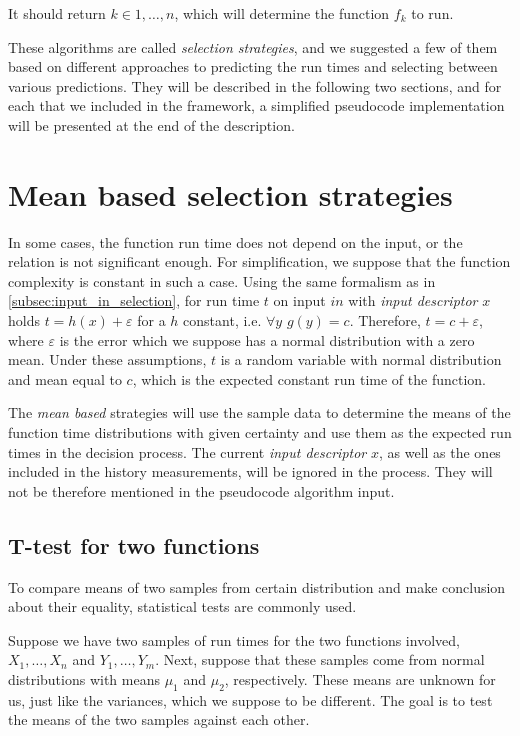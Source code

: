 It should return $k \in {1,\dots,n}$, which will determine the function $f_k$ to run.

These algorithms are called \textit{selection strategies}, and we suggested a few of them based on different approaches to predicting the run times and selecting between various predictions. They will be described in the following two sections, and for each that we included in the framework, a simplified pseudocode implementation will be presented at the end of the description.

\section{Mean based selection strategies}
\label{sec:mean_based_strategies}

In some cases, the function run time does not depend on the input, or the relation is not significant enough. For simplification, we suppose that the function complexity is constant in such a case. Using the same formalism as in \ref{subsec:input_in_selection}, for run time $t$ on input $in$ with \textit{input descriptor} $x$ holds \(t = h(x) + \varepsilon\) for a $h$ constant, i.e. $\forall y$ $g(y) = c$. Therefore, $t = c + \varepsilon$, where $\varepsilon$ is the error which we suppose has a normal distribution with a zero mean. Under these assumptions, $t$ is a random variable with normal distribution and mean equal to $c$, which is the expected constant run time of the function.

The \textit{mean based} strategies will use the sample data to determine the means of the function time distributions with given certainty and use them as the expected run times in the decision process. The current \textit{input descriptor} $x$, as well as the ones included in the history measurements, will be ignored in the process. They will not be therefore mentioned in the pseudocode algorithm input.

\subsection{T-test for two functions}
\label{subsec:t_test_two}

To compare means of two samples from certain distribution and make conclusion about their equality, statistical tests are commonly used.

Suppose we have two samples of run times for the two functions involved, $X_1,\dots, X_n$ and $Y_1,\dots, Y_m$. Next, suppose that these samples come from normal distributions with means $\mu_1$ and $\mu_2$, respectively. These means are unknown for us, just like the variances, which we suppose to be different. The goal is to test the means of the two samples against each other.


